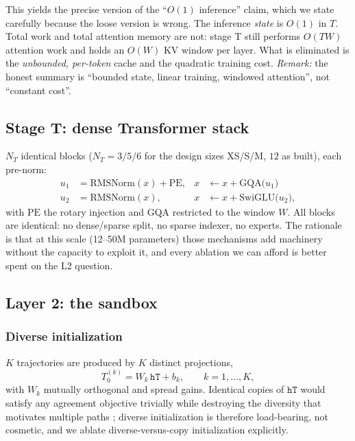 \documentclass[11pt,a4paper]{article}
\newcommand{\Rt}{\mathrm{RMSNorm}}
\theoremstyle{plain}
\theoremstyle{definition}
\theoremstyle{remark}
\begin{document}
\noindent
This yields the precise version of the ``$O(1)$ inference'' claim, which we
state carefully because the loose version is wrong. The inference
\emph{state} is $O(1)$ in $T$. Total work and total attention memory are not:
stage T still performs $O(TW)$ attention work and holds an $O(W)$ KV window per
layer. What is eliminated is the \emph{unbounded, per-token} cache and the
quadratic training cost. \emph{Remark:} the honest summary is ``bounded state,
linear training, windowed attention'', not ``constant cost''.

\subsection{Stage T: dense Transformer stack}

\noindent
$N_T$ identical blocks ($N_T = 3/5/6$ for the design sizes XS/S/M, $12$ as built), each pre-norm:
\begin{equation}
  \begin{aligned}
  u_1 &= \Rt(x) + \mathrm{PE}, &
  x &\leftarrow x + \mathrm{GQA}\bigl(u_1\bigr) \\
  u_2 &= \Rt(x), &
  x &\leftarrow x + \mathrm{SwiGLU}\bigl(u_2\bigr),
  \end{aligned}
  \label{eq:t-block}
\end{equation}
with $\mathrm{PE}$ the rotary injection and GQA restricted to the window
$W$. All blocks are identical: no dense/sparse split, no sparse indexer, no
experts. The rationale is that at this scale (12--50M parameters) those mechanisms add
machinery without the capacity to exploit it, and every ablation we can afford
is better spent on the L2 question.

\subsection{Layer 2: the sandbox}

\subsubsection{Diverse initialization}

\noindent
$K$ trajectories are produced by $K$ distinct projections,
\begin{equation}
  T^{(k)}_0 = W_k\, \texttt{hT} + b_k, \qquad k = 1,\dots,K,
  \label{eq:l2-init}
\end{equation}
with $W_k$ mutually orthogonal and spread gains. Identical copies of
$\texttt{hT}$ would satisfy any agreement objective trivially while destroying
the diversity that motivates multiple paths \cite{liang2023divergent}; diverse
initialization is therefore load-bearing, not cosmetic, and we ablate
diverse-versus-copy initialization explicitly.
\end{document}
